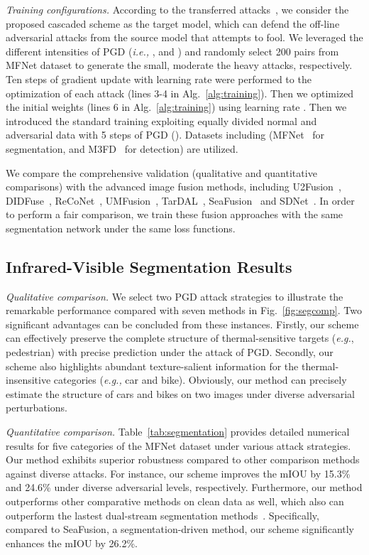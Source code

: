 \documentclass[sigconf]{acmart}
\begin{document}
\textit{Training configurations.} According to the transferred attacks~\cite{xie2019improving}, we consider the proposed cascaded scheme as the target model, which can defend the off-line adversarial attacks from the source model that attempts to fool. We leveraged the different intensities of PGD (\textit{i.e.,} ,
 and )  and randomly select 200 pairs from MFNet dataset to generate the small, moderate the heavy attacks, respectively.  Ten steps of gradient update with learning rate  were performed to the optimization of each attack (lines 3-4 in Alg.~\ref{alg:training}). Then we optimized the initial weights  (lines 6 in Alg.~\ref{alg:training}) using learning rate . Then we introduced the standard  training exploiting equally divided  normal  and adversarial data with 5 steps of PGD (). Datasets including (MFNet~\cite{takumi2017multispectral} for segmentation, and M3FD~\cite{TarDAL}  for detection) are utilized.

We compare the comprehensive validation (qualitative and quantitative comparisons) with the advanced image fusion methods, including U2Fusion~\cite{U2Fusion2020}, DIDFuse~\cite{zhao2020didfuse}, ReCoNet~\cite{reconet}, UMFusion~\cite{UMFusion}, TarDAL~\cite{TarDAL}, SeaFusion~\cite{SeaFusion} and  SDNet~\cite{zhang2021sdnet}.
In order to perform a fair comparison, we train these fusion approaches with the same segmentation network under the same loss functions.




\subsection{Infrared-Visible Segmentation Results}


\textit{Qualitative comparison.} We select two PGD attack strategies to illustrate the remarkable performance compared with seven methods in Fig.~\ref{fig:segcomp}. Two significant advantages can be concluded from these instances. Firstly, our scheme can effectively preserve the complete structure of thermal-sensitive targets (\textit{e.g.}, pedestrian) with precise prediction under the attack of PGD. Secondly, our scheme also highlights abundant texture-salient information for the thermal-insensitive categories (\textit{e.g.,} car and bike). Obviously, our method can precisely estimate the structure of cars and bikes on two  images under diverse adversarial perturbations.


\textit{Quantitative comparison.} Table~\ref{tab:segmentation} provides detailed numerical results for five categories of the MFNet dataset under various attack strategies. Our method exhibits superior robustness compared to other comparison methods against diverse attacks. For instance, our scheme improves the mIOU by 15.3\% and 24.6\% under diverse adversarial levels, respectively. Furthermore, our method outperforms other comparative methods on clean data as well, which also can outperform the lastest dual-stream segmentation methods~\cite{lasnet,zhou2022edge}. Specifically, compared to SeaFusion, a segmentation-driven method, our scheme significantly enhances the mIOU by 26.2\%.
\end{document}
